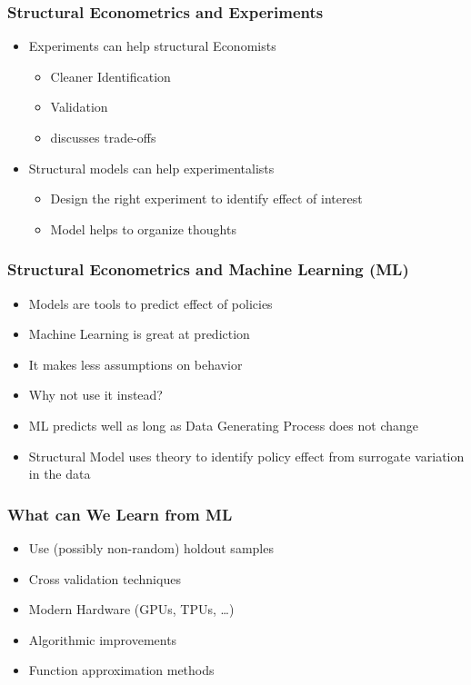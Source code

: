 \documentclass[11pt]{beamer}
\begin{document}
\begin{frame}[c]\frametitle{Structural Econometrics and Experiments}
    \begin{itemize}
        \item Experiments can help structural Economists
        \begin{itemize}
            \item Cleaner Identification
            \item Validation
            \item \cite{Wolpin2013} discusses trade-offs
        \end{itemize}
        \item Structural models can help experimentalists
        \begin{itemize}
            \item Design the right experiment to identify effect of interest
            \item Model helps to organize thoughts \citep{DellaVigna2017a}
        \end{itemize}
    \end{itemize}
\end{frame}


\begin{frame}[c]\frametitle{Structural Econometrics and Machine Learning (ML)}
    \begin{itemize}
        \item Models are tools to predict effect of policies
        \item Machine Learning is great at prediction
        \item It makes less assumptions on behavior
        \item Why not use it instead?
        \pause
        \item ML predicts well as long as Data Generating Process does not change
        \item Structural Model uses theory to identify policy effect from surrogate variation in the data
    \end{itemize}
\end{frame}


\begin{frame}[c]\frametitle{What can We Learn from ML}
    \begin{itemize}
        \item Use (possibly non-random) holdout samples
        \item Cross validation techniques
        \item Modern Hardware (GPUs, TPUs, \ldots)
        \item Algorithmic improvements
        \item Function approximation methods
    \end{itemize}
\end{frame}
\end{document}
